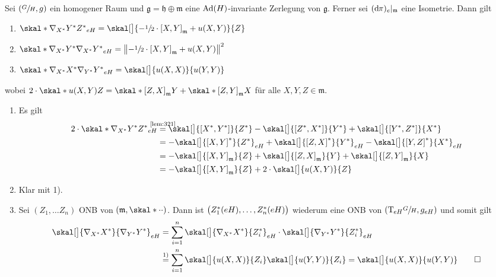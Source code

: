 \begin{korollar}[{name=[Killingfelder und die Levi-Cevita-Ableitung]}]
	Sei $\enbrace*{\sfrac{G}{H},g}$ ein homogener Raum und $\mathfrak{g} = \mathfrak{h} \oplus \mathfrak{m}$ eine $\Ad(H)$-invariante Zerlegung von $\mathfrak{g}$.
	Ferner sei $(\mathd \pi)_e|_{\mathfrak{m}}$ eine Isometrie.
	Dann gilt
	\begin{enumerate}[1)]
		\item $\skal*{\nabla_{X^*} Y^*}{Z^*}_{eH} = \skal[\big]{- \sfrac{1}{2} \cdot \benbrace*{X,Y}_{\mathfrak{m}} + u(X,Y)}{Z}$
		\item $\skal*{\nabla_{X^*} Y^*}{\nabla_{X^*} Y^*}_{eH} = \norm[\big]{- \sfrac{1}{2} \cdot \benbrace*{X,Y}_\mathfrak{m} + u(X,Y)}^2$
		\item $\skal*{\nabla_{X^*} X^*}{\nabla_{Y^*} Y^*}_{eH} = \skal[\big]{u(X,X)}{u(Y,Y)} $
	\end{enumerate}
	wobei $2 \cdot \skal*{u(X,Y)}{Z} = \skal*{\benbrace*{Z,X}_\mathfrak{m}}{Y} + \skal*{\benbrace*{Z,Y}_\mathfrak{m}}{X}$ für alle $X,Y,Z \in \mathfrak{m}$.
\end{korollar}
\begin{beweis}
	\begin{enumerate}[1)]
		\item Es gilt
		\begin{align}
			2 \cdot \skal*{\nabla_{X^*} Y^*}{Z^*}_{eH} &\StackTextClap{\ref{lem:321}}{=} \skal[\big]{\benbrace*{X^*,Y^*}}{Z^*} - \skal[\big]{\benbrace*{Z^*,X^*}}{Y^*} + \skal[\big]{\benbrace*{Y^*,Z^*}}{X^*} \\
			&= - \skal[\big]{\benbrace*{X,Y}^* }{Z^*}_{eH} + \skal[\big]{\benbrace*{Z,X}^*}{Y^*}_{eH} - \skal[\big]{\benbrace*{Y,Z}^*}{X^*}_{eH} \\
			&= - \skal[\big]{\benbrace*{X,Y}_\mathfrak{m}}{Z} + \skal[\big]{\benbrace*{Z,X}_\mathfrak{m}}{Y} + \skal[\big]{\benbrace*{Z,Y}_\mathfrak{m}}{X} \\
			&= - \skal[\big]{\benbrace*{X,Y}_\mathfrak{m}}{Z} + 2 \cdot \skal[\big]{u(X,Y)}{Z}
		\end{align}
		\item Klar mit 1).
		\item Sei $(Z_1,\ldots Z_n)$ ONB von $(\mathfrak{m},\skal*{\cdot }{\cdot })$.
		Dann ist $\enbrace[\big]{Z_1^*(eH), \ldots , Z_n^*(eH)}$ wiederum eine ONB von $\enbrace*{\Tmap_{eH}\sfrac{G}{H},g_{eH}}$ und somit gilt
		\begin{align}
			\skal[\big]{\nabla_{X^*}X^*}{\nabla_{Y^*} Y^*}_{eH} &= \sum_{i=1}^{n} \skal[\big]{\nabla_{X^*} X^*}{Z_i^*}_{eH} \cdot \skal[\big]{\nabla_{Y^*} Y^*}{Z_i^*}_{eH} \\
			&\StackText{1)}{=} \sum_{i=1}^{n} \skal[\big]{u(X,X)}{Z_i} \skal[\big]{u(Y,Y)}{Z_i} = \skal[\big]{u(X,X)}{u(Y,Y)} \qedhere
		\end{align}
	\end{enumerate}
\end{beweis}

